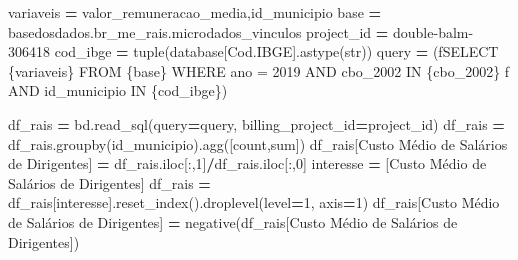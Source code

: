 \documentclass[
  12,
  dvipsnames]{article}
\newenvironment{Shaded}{\begin{snugshade}}{\end{snugshade}}
\newcommand{\BuiltInTok}[1]{#1}
\newcommand{\DecValTok}[1]{\textcolor[rgb]{0.00,0.00,0.81}{#1}}
\newcommand{\NormalTok}[1]{#1}
\newcommand{\OperatorTok}[1]{\textcolor[rgb]{0.81,0.36,0.00}{\textbf{#1}}}
\newcommand{\SpecialCharTok}[1]{\textcolor[rgb]{0.00,0.00,0.00}{#1}}
\newcommand{\SpecialStringTok}[1]{\textcolor[rgb]{0.31,0.60,0.02}{#1}}
\newcommand{\StringTok}[1]{\textcolor[rgb]{0.31,0.60,0.02}{#1}}
\begin{document}
\begin{Shaded}
\begin{Highlighting}[]
\NormalTok{variaveis }\OperatorTok{=} \StringTok{\textquotesingle{}valor\_remuneracao\_media,id\_municipio\textquotesingle{}}
\NormalTok{base }\OperatorTok{=} \StringTok{\textquotesingle{}\textasciigrave{}basedosdados.br\_me\_rais.microdados\_vinculos\textasciigrave{}\textquotesingle{}}
\NormalTok{project\_id }\OperatorTok{=} \StringTok{\textquotesingle{}double{-}balm{-}306418\textquotesingle{}}
\NormalTok{cod\_ibge }\OperatorTok{=} \BuiltInTok{tuple}\NormalTok{(database[}\StringTok{\textquotesingle{}Cod.IBGE\textquotesingle{}}\NormalTok{].astype(}\BuiltInTok{str}\NormalTok{))}
\NormalTok{query }\OperatorTok{=}\NormalTok{ (}\SpecialStringTok{f\textquotesingle{}SELECT }\SpecialCharTok{\{}\NormalTok{variaveis}\SpecialCharTok{\}}\SpecialStringTok{ FROM }\SpecialCharTok{\{}\NormalTok{base}\SpecialCharTok{\}}\SpecialStringTok{ WHERE ano = 2019 AND cbo\_2002 IN }\SpecialCharTok{\{}\NormalTok{cbo\_2002}\SpecialCharTok{\}}\SpecialStringTok{\textquotesingle{}}
         \SpecialStringTok{f\textquotesingle{} AND id\_municipio IN }\SpecialCharTok{\{}\NormalTok{cod\_ibge}\SpecialCharTok{\}}\SpecialStringTok{\textquotesingle{}}\NormalTok{)}

\NormalTok{df\_rais }\OperatorTok{=}\NormalTok{ bd.read\_sql(query}\OperatorTok{=}\NormalTok{query, billing\_project\_id}\OperatorTok{=}\NormalTok{project\_id)}
\NormalTok{df\_rais }\OperatorTok{=}\NormalTok{ df\_rais.groupby(}\StringTok{\textquotesingle{}id\_municipio\textquotesingle{}}\NormalTok{).agg([}\StringTok{\textquotesingle{}count\textquotesingle{}}\NormalTok{,}\StringTok{\textquotesingle{}sum\textquotesingle{}}\NormalTok{])}
\NormalTok{df\_rais[}\StringTok{\textquotesingle{}Custo Médio de Salários de Dirigentes\textquotesingle{}}\NormalTok{] }\OperatorTok{=}\NormalTok{ df\_rais.iloc[:,}\DecValTok{1}\NormalTok{]}\OperatorTok{/}\NormalTok{df\_rais.iloc[:,}\DecValTok{0}\NormalTok{] }
\NormalTok{interesse }\OperatorTok{=}\NormalTok{ [}\StringTok{\textquotesingle{}Custo Médio de Salários de Dirigentes\textquotesingle{}}\NormalTok{]}
\NormalTok{df\_rais }\OperatorTok{=}\NormalTok{ df\_rais[interesse].reset\_index().droplevel(level}\OperatorTok{=}\DecValTok{1}\NormalTok{, axis}\OperatorTok{=}\DecValTok{1}\NormalTok{)}
\NormalTok{df\_rais[}\StringTok{\textquotesingle{}Custo Médio de Salários de Dirigentes\textquotesingle{}}\NormalTok{] }\OperatorTok{=}\NormalTok{ negative(df\_rais[}\StringTok{\textquotesingle{}Custo Médio de Salários de Dirigentes\textquotesingle{}}\NormalTok{])}


\end{Highlighting}
\end{Shaded}
\end{document}
